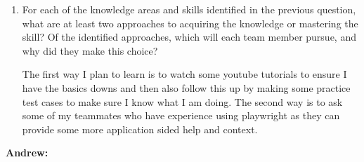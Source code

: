 \documentclass[12pt, titlepage]{article}
\begin{document}
\begin{enumerate}
  \item For each of the knowledge areas and skills identified in the previous
  question, what are at least two approaches to acquiring the knowledge or
  mastering the skill?  Of the identified approaches, which will each team
  member pursue, and why did they make this choice?

  The first way I plan to learn is to watch some youtube tutorials to ensure I have the 
  basics downs and then also follow this up by making some practice test cases to make sure I 
  know what I am doing. The second way is to ask some of my teammates who have experience 
  using playwright as they can provide some more application sided help and context.
  
\end{enumerate}

\textbf{Andrew:}
\end{document}
